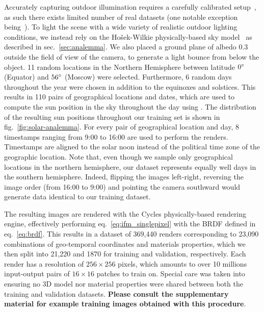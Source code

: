 Accurately capturing outdoor illumination requires a carefully calibrated setup~\cite{stumpfel-afrigraph-04}, as such there exists limited number of real datasets (one notable exception being~\cite{hdrdb}). To light the scene with a wide variety of realistic outdoor lighting conditions, we instead rely on the Ho\v{s}ek-Wilkie physically-based sky model~\cite{hosek-siggraph-12} as described in sec.~\ref{sec:analemma}. We also placed a ground plane of albedo 0.3 outside the field of view of the camera, to generate a light bounce from below the object. 11 random locations in the Northern Hemisphere between latitude $0^{\circ}$ (Equator) and $56^{\circ}$ (Moscow) were selected. Furthermore, 6 random days throughout the year were chosen in addition to the equinoxes and solstices. This results in 110 pairs of geographical locations and dates, which are used to compute the sun position in the sky throughout the day using \cite{bretagnon-aaa-88}. The distribution of the resulting sun positions throughout our training set is shown in fig.~\ref{fig:solar-analemma}. For every pair of geographical location and day, 8 timestamps ranging from 9:00 to 16:00 are used to perform the renders. Timestamps are aligned to the solar noon instead of the political time zone of the geographic location. Note that, even though we sample only geographical locations in the northern hemisphere, our dataset represents equally well days in the southern hemisphere. Indeed, flipping the images left-right, reversing the image order (from 16:00 to 9:00) and pointing the camera southward would generate data identical to our training dataset.

The resulting images are rendered with the Cycles physically-based rendering engine, effectively performing eq.~\eqref{eq:ifm_singlepixel} with the BRDF defined in eq.~\eqref{eq:brdf}. This results in a dataset of 369,440 renders corresponding to 23,090 combinations of geo-temporal coordinates and materials properties, which we then split into 21,220 and 1870 for training and validation, respectively. Each render has a resolution of $256 \times 256$ pixels, which amounts to over 10 millions input-output pairs of $16 \times 16$ patches to train on. Special care was taken into ensuring no 3D model nor material properties were shared between both the training and validation datasets. \textbf{Please consult the supplementary material for example training images obtained with this procedure}. 

